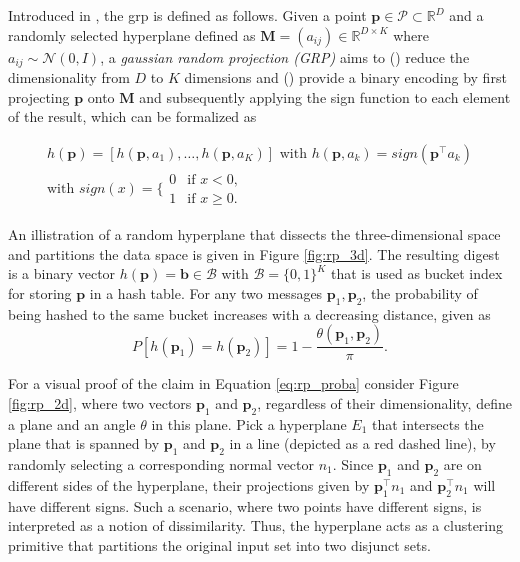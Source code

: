 \documentclass[../../../main.tex]{subfiles}
\begin{document}
Introduced in \cite{charikar2002similarity}, the \gls{grp} is defined as follows. Given a point $\bm{p} \in \mathcal{P} \subset \mathbb{R}^D$ and a randomly selected hyperplane defined as $\bm{M}=(a_{ij}) \in \mathbb{R}^{D \times K}$ where $a_{ij} \sim \mathcal{N}(0, I)$, a \textit{gaussian random projection (GRP)} aims to () reduce the dimensionality from $D$ to $K$ dimensions and () provide a binary encoding by first projecting $\bm{p}$ onto $\bm{M}$ and subsequently applying the sign function to each element of the result, which can be formalized as

\begin{gather}\label{eq:grp_sign}
    h(\bm{p}) = [h(\bm{p}, a_1), \dots, h(\bm{p}, a_K)] \text{ with } h(\bm{p}, a_k) = sign(\bm{p}^\top a_k) \\
    \text{with } sign(x) = \Biggl\{ \begin{array}{lc}
        0 & \text{if } x < 0, \\
        1 & \text{if } x \geq 0.
    \end{array}
\end{gather}

An illistration of a random hyperplane that dissects the three-dimensional space and partitions the data space is given in Figure \ref{fig:rp_3d}. The resulting digest is a binary vector $h(\bm{p}) = \bm{b} \in \mathcal{B}$ with $\mathcal{B} = \{0, 1\}^K$ that is used as bucket index for storing $\bm{p}$ in a hash table. For any two messages $\bm{p}_1, \bm{p}_2$, the probability of being hashed to the same bucket increases with a decreasing distance, given as
\begin{equation}\label{eq:rp_proba}
    P[h(\bm{p}_1) = h(\bm{p}_2)] = 1 - \frac{\theta(\bm{p}_1, \bm{p}_2)}{\pi}.
\end{equation}

For a visual proof of the claim in Equation \ref{eq:rp_proba} consider Figure \ref{fig:rp_2d}, where two vectors $\bm{p}_1$ and $\bm{p}_2$, regardless of their dimensionality, define a plane and an angle $\theta$ in this plane. Pick a hyperplane $E_1$ that intersects the plane that is spanned by $\bm{p}_1$ and $\bm{p}_2$ in a line (depicted as a red dashed line), by randomly selecting a corresponding normal vector $n_1$. Since $\bm{p}_1$ and $\bm{p}_2$ are on different sides of the hyperplane, their projections given by $\bm{p}_1^\top n_1$ and  $\bm{p}_2^\top n_1$ will have different signs. Such a scenario, where two points have different signs, is interpreted as a notion of dissimilarity. Thus, the hyperplane acts as a clustering primitive that partitions the original input set into two disjunct sets.
\end{document}
